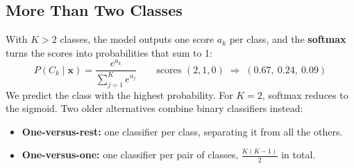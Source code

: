 \subsection*{More Than Two Classes}
\begin{keeptogether}
With $K > 2$ classes, the model outputs one score $a_k$ per class, and the \textbf{softmax} turns the scores into probabilities that sum to 1:
\[
P(C_k \mid \mathbf{x}) = \frac{e^{a_k}}{\sum_{j=1}^{K} e^{a_j}}
\qquad \text{scores } (2, 1, 0) \;\Rightarrow\; (0.67,\ 0.24,\ 0.09)
\]
We predict the class with the highest probability. For $K = 2$, softmax reduces to the sigmoid. Two older alternatives combine binary classifiers instead:
\begin{itemize}
  \item \textbf{One-versus-rest:} one classifier per class, separating it from all the others.
  \item \textbf{One-versus-one:} one classifier per pair of classes, $\tfrac{K(K-1)}{2}$ in total.
\end{itemize}
\end{keeptogether}
